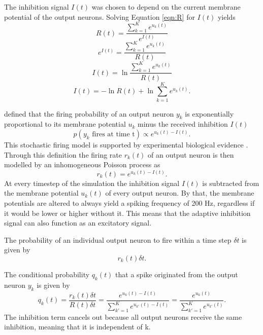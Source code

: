 The inhibition signal $I(t)$ was chosen to depend on the current membrane potential of the output neurons. 
Solving Equation \ref{eqn:R} for $I(t)$ yields
\begin{equation}
\label{}
R(t) = \frac{ \sum_{k=1}^K e^{u_k(t)}}{e^{I(t)}}
\end{equation}
\begin{equation}
\label{}
e^{I(t)} = \frac{\sum_{k=1}^K e^{u_k(t)}}{R(t)}
\end{equation}
\begin{equation}
\label{}
I(t) = \ln{ \frac{ \sum_{k=1}^K e^{u_k(t)}}{R(t)}}
\end{equation}
\begin{equation}
\label{eqn:I(t)}
I(t) =  - \ln{R(t)} + \ln{  \sum_{k=1}^K e^{u_k(t)}}.
\end{equation}

\citet{nessler} defined that the firing probability of an output neuron  $y_k$ is exponentially proportional to its membrane potential $u_k$ minus the received inhibition $I(t)$
\begin{equation}
\label{eqn:pVonY}
p(y_k \text{ fires at time t}) \propto e^{u_k(t) - I(t)}.
\end{equation}
This stochastic firing model is supported by experimental biological evidence \citep{woDasEHerkommt}. Through this definition the firing rate $r_k(t)$ of an output neuron is then modelled by an inhomogeneous Poisson process as
\begin{equation}
\label{eqn:rk}
r_k(t) = e^{u_k(t) - I(t)}.
\end{equation}
At every timestep of the simulation the inhibition signal $I(t)$ is subtracted from the membrane potential $u_k(t)$ of every output neuron. By that, the membrane potentials are altered to always yield a spiking frequency of 200 Hz, regardless if it would be lower or higher without it. This means that the adaptive inhibition signal can also function as an excitatory signal. 

The probability of an individual output neuron to fire within a time step $\delta t$ is given by
\begin{equation}
\label{eqn:rkdt}
r_k(t) \delta t.
\end{equation}

The conditional probability $q_k(t)$ that a spike originated from the output neuron $y_k$ is given by
\begin{equation}
\label{eqn:qk}
q_k(t) = \frac{r_k(t) \delta t}{R(t) \delta t} = \frac{e^{u_k(t) - I(t)}}{\sum_{k'=1}^K e^{u_{k'}(t) - I(t)}} = \frac{e^{u_k(t)}}{\sum_{k'=1}^K e^{u_{k'}(t)}}.
\end{equation}
The inhibition term cancels out because all output neurons receive the same inhibition, meaning that it is independent of k.

